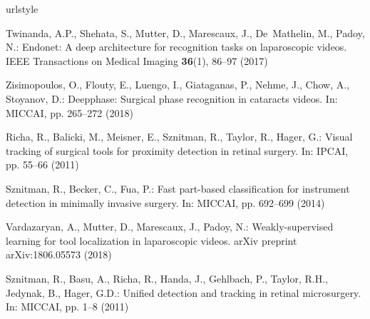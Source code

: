 \documentclass{svjour3}                     \smartqed
\begin{document}
\iffalse
\begin{compliance}
\medskip \noindent \textbf{Conflict of interest:} The authors declare that they have no conflict of interest.

\medskip \noindent \textbf{Ethical approval:} This article does not contain any studies with human participants or animals performed by any of the authors.

\medskip \noindent \textbf{Informed consent:} Statement of informed consent was not applicable since the manuscript does not contain any patient data.
\end{compliance}
\fi






\begin{thebibliography}{10}
\providecommand{\url}[1]{{#1}}
\providecommand{\urlprefix}{URL }
\expandafter\ifx\csname urlstyle\endcsname\relax
  \providecommand{\doi}[1]{DOI~\discretionary{}{}{}#1}\else
  \providecommand{\doi}{DOI~\discretionary{}{}{}\begingroup
  \urlstyle{rm}\Url}\fi

Twinanda, A.P., Shehata, S., Mutter, D., Marescaux, J., De~Mathelin, M., Padoy,
  N.: Endonet: A deep architecture for recognition tasks on laparoscopic
  videos.
\newblock IEEE Transactions on Medical Imaging \textbf{36}(1), 86--97 (2017)

Zisimopoulos, O., Flouty, E., Luengo, I., Giataganas, P., Nehme, J., Chow, A.,
  Stoyanov, D.: Deepphase: Surgical phase recognition in cataracts videos.
\newblock In: MICCAI, pp. 265--272 (2018)

Richa, R., Balicki, M., Meisner, E., Sznitman, R., Taylor, R., Hager, G.:
  Visual tracking of surgical tools for proximity detection in retinal surgery.
\newblock In: IPCAI, pp. 55--66 (2011)

Sznitman, R., Becker, C., Fua, P.: Fast part-based classification for
  instrument detection in minimally invasive surgery.
\newblock In: MICCAI, pp. 692--699 (2014)

Vardazaryan, A., Mutter, D., Marescaux, J., Padoy, N.: Weakly-supervised
  learning for tool localization in laparoscopic videos.
\newblock arXiv preprint arXiv:1806.05573  (2018)

Sznitman, R., Basu, A., Richa, R., Handa, J., Gehlbach, P., Taylor, R.H.,
  Jedynak, B., Hager, G.D.: Unified detection and tracking in retinal
  microsurgery.
\newblock In: MICCAI, pp. 1--8 (2011)


\end{thebibliography}
\end{document}
